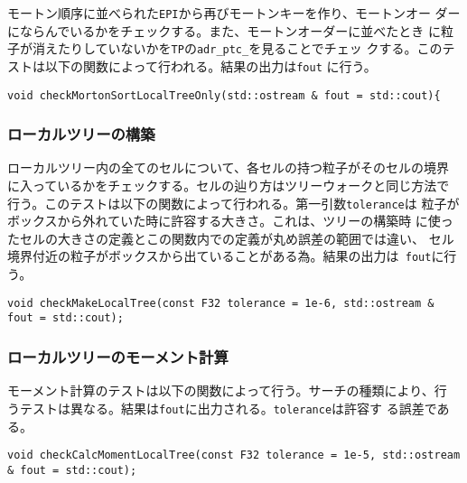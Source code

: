 モートン順序に並べられた{\tt EPI}から再びモートンキーを作り、モートンオー
ダーにならんでいるかをチェックする。また、モートンオーダーに並べたとき
に粒子が消えたりしていないかを{\tt TP}の{\tt adr\_ptc\_}を見ることでチェッ
クする。このテストは以下の関数によって行われる。結果の出力は{\tt fout}
に行う。

\begin{screen}
\begin{verbatim}
void checkMortonSortLocalTreeOnly(std::ostream & fout = std::cout){
\end{verbatim}
\end{screen}

\subsubsection{ローカルツリーの構築}

ローカルツリー内の全てのセルについて、各セルの持つ粒子がそのセルの境界
に入っているかをチェックする。セルの辿り方はツリーウォークと同じ方法で
行う。このテストは以下の関数によって行われる。第一引数{\tt tolerance}は
粒子がボックスから外れていた時に許容する大きさ。これは、ツリーの構築時
に使ったセルの大きさの定義とこの関数内での定義が丸め誤差の範囲では違い、
セル境界付近の粒子がボックスから出ていることがある為。結果の出力は{\tt
fout}に行う。

\begin{screen}
\begin{verbatim}
void checkMakeLocalTree(const F32 tolerance = 1e-6, std::ostream & fout = std::cout);
\end{verbatim}
\end{screen}

\subsubsection{ローカルツリーのモーメント計算}

モーメント計算のテストは以下の関数によって行う。サーチの種類により、行
うテストは異なる。結果は{\tt fout}に出力される。{\tt tolerance}は許容す
る誤差である。

\begin{screen}
\begin{verbatim}
void checkCalcMomentLocalTree(const F32 tolerance = 1e-5, std::ostream & fout = std::cout);
\end{verbatim}
\end{screen}



